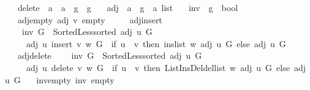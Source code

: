 \begin{isabellebody}
\ \ \ delete\ {\isacharcolon}{\kern0pt}{\isacharcolon}{\kern0pt}\ {\isachardoublequoteopen}{\isacharprime}{\kern0pt}a\ {\isasymRightarrow}\ {\isacharprime}{\kern0pt}a\ {\isasymRightarrow}\ {\isacharprime}{\kern0pt}g\ {\isasymRightarrow}\ {\isacharprime}{\kern0pt}g{\isachardoublequoteclose}\isanewline
\ \ \ adj\ {\isacharcolon}{\kern0pt}{\isacharcolon}{\kern0pt}\ {\isachardoublequoteopen}{\isacharprime}{\kern0pt}a\ {\isasymRightarrow}\ {\isacharprime}{\kern0pt}g\ {\isasymRightarrow}\ {\isacharprime}{\kern0pt}a\ list{\isachardoublequoteclose}\isanewline
\ \ \ inv\ {\isacharcolon}{\kern0pt}{\isacharcolon}{\kern0pt}\ {\isachardoublequoteopen}{\isacharprime}{\kern0pt}g\ {\isasymRightarrow}\ bool{\isachardoublequoteclose}\isanewline
\ \ \ adj{\isacharunderscore}{\kern0pt}empty{\isacharcolon}{\kern0pt}\ {\isachardoublequoteopen}adj\ v\ empty\ {\isacharequal}{\kern0pt}\ {\isacharbrackleft}{\kern0pt}{\isacharbrackright}{\kern0pt}{\isachardoublequoteclose}\isanewline
\ \ \ adj{\isacharunderscore}{\kern0pt}insert{\isacharcolon}{\kern0pt}\isanewline
\ \ \ \ {\isachardoublequoteopen}inv\ G\ {\isasymand}\ Sorted{\isacharunderscore}{\kern0pt}Less{\isachardot}{\kern0pt}sorted\ {\isacharparenleft}{\kern0pt}adj\ u\ G{\isacharparenright}{\kern0pt}\ {\isasymLongrightarrow}\isanewline
\ \ \ \ \ adj\ u\ {\isacharparenleft}{\kern0pt}insert\ v\ w\ G{\isacharparenright}{\kern0pt}\ {\isacharequal}{\kern0pt}\ {\isacharparenleft}{\kern0pt}if\ u\ {\isacharequal}{\kern0pt}\ v\ then\ ins{\isacharunderscore}{\kern0pt}list\ w\ {\isacharparenleft}{\kern0pt}adj\ u\ G{\isacharparenright}{\kern0pt}\ else\ adj\ u\ G{\isacharparenright}{\kern0pt}{\isachardoublequoteclose}\isanewline
\ \ \ adj{\isacharunderscore}{\kern0pt}delete{\isacharcolon}{\kern0pt}\isanewline
\ \ \ \ {\isachardoublequoteopen}inv\ G\ {\isasymand}\ Sorted{\isacharunderscore}{\kern0pt}Less{\isachardot}{\kern0pt}sorted\ {\isacharparenleft}{\kern0pt}adj\ u\ G{\isacharparenright}{\kern0pt}\ {\isasymLongrightarrow}\isanewline
\ \ \ \ \ adj\ u\ {\isacharparenleft}{\kern0pt}delete\ v\ w\ G{\isacharparenright}{\kern0pt}\ {\isacharequal}{\kern0pt}\ {\isacharparenleft}{\kern0pt}if\ u\ {\isacharequal}{\kern0pt}\ v\ then\ List{\isacharunderscore}{\kern0pt}Ins{\isacharunderscore}{\kern0pt}Del{\isachardot}{\kern0pt}del{\isacharunderscore}{\kern0pt}list\ w\ {\isacharparenleft}{\kern0pt}adj\ u\ G{\isacharparenright}{\kern0pt}\ else\ adj\ u\ G{\isacharparenright}{\kern0pt}{\isachardoublequoteclose}\isanewline
\ \ \ inv{\isacharunderscore}{\kern0pt}empty{\isacharcolon}{\kern0pt}\ {\isachardoublequoteopen}inv\ empty{\isachardoublequoteclose}\isanewline

\end{isabellebody}
